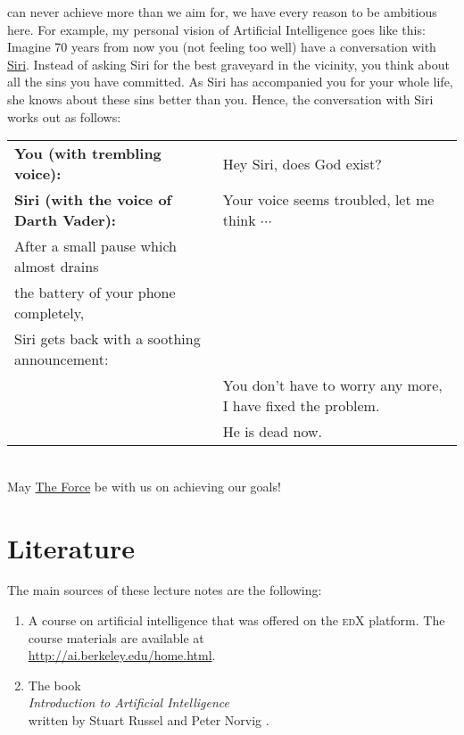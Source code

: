 can never achieve more than we aim for, we have every reason to be ambitious here.  For example, my
personal vision of Artificial Intelligence goes like this: 
Imagine 70 years from now you (not feeling too well) have a conversation with
\href{https://en.wikipedia.org/wiki/Siri}{Siri}.  Instead of asking Siri for the
best graveyard in the vicinity, you think about all the sins you have committed.  As Siri has
accompanied you for your whole life, she knows about these sins better than you.  Hence,  
the conversation with Siri works out as follows: 
\\[0.2cm]
\begin{tabular}[t]{ll}
\textbf{You (with trembling voice):} & Hey Siri, does God exist?   \\[0.2cm]
\textbf{Siri (with the voice of Darth Vader):} & Your voice seems troubled, let me think $\cdots$ \\
After a small pause which almost drains \\
the battery of your phone completely, \\
Siri gets back with a soothing announcement: \\           
                                     & You don't have to worry any more, I have fixed the problem.  \\
                                     & He is dead now.  
\end{tabular}
\\[0.2cm]
May \href{https://en.wikipedia.org/wiki/The_Force_(Star_Wars)}{The Force} be with us on achieving our goals!

\section{Literature}
The main sources of these lecture notes are the following:
\begin{enumerate}
\item A course on artificial intelligence that was offered on the \textsc{edX} platform.  The course
      materials are available at  
      \\[0.2cm]
      \hspace*{1.3cm}
      \href{http://ai.berkeley.edu/home.html}{http://ai.berkeley.edu/home.html}.
\item The book
      \\[0.2cm]
      \hspace*{1.3cm}
      \emph{Introduction to Artificial Intelligence}
      \\[0.2cm]
      written by Stuart Russel and Peter Norvig \cite{russell:2009}.
\end{enumerate}



